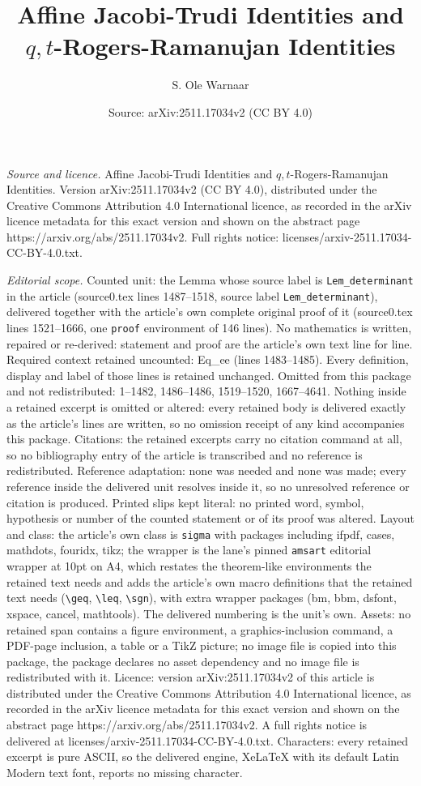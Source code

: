 \documentclass[10pt,a4paper]{amsart}
\title[Affine Jacobi-Trudi Identities and $q,t$-Rogers-Ramanujan Id]{Affine Jacobi-Trudi Identities and $q,t$-Rogers-Ramanujan Identities}
\author{S. Ole Warnaar}
\date{Source: arXiv:2511.17034v2 (CC BY 4.0)}
\begin{document}
\maketitle

\noindent\emph{Source and licence.} Affine Jacobi-Trudi Identities and $q,t$-Rogers-Ramanujan Identities. Version arXiv:2511.17034v2 (CC BY 4.0), distributed under the Creative Commons Attribution 4.0 International licence, as recorded in the arXiv licence metadata for this exact version and shown on the abstract page https://arxiv.org/abs/2511.17034v2. Full rights notice: licenses/arxiv-2511.17034-CC-BY-4.0.txt.\par\smallskip

\noindent\textit{Editorial scope.} Counted unit: the Lemma whose source label is \texttt{Lem\_determinant} in the article (source0.tex lines 1487--1518, source label \texttt{Lem\_determinant}), delivered together with the article's own complete original proof of it (source0.tex lines 1521--1666, one \texttt{proof} environment of 146 lines). No mathematics is written, repaired or re-derived: statement and proof are the article's own text line for line. Required context retained uncounted: Eq\_ee (lines 1483--1485). Every definition, display and label of those lines is retained unchanged. Omitted from this package and not redistributed: 1--1482, 1486--1486, 1519--1520, 1667--4641. Nothing inside a retained excerpt is omitted or altered: every retained body is delivered exactly as the article's lines are written, so no omission receipt of any kind accompanies this package. Citations: the retained excerpts carry no citation command at all, so no bibliography entry of the article is transcribed and no reference is redistributed. Reference adaptation: none was needed and none was made; every reference inside the delivered unit resolves inside it, so no unresolved reference or citation is produced. Printed slips kept literal: no printed word, symbol, hypothesis or number of the counted statement or of its proof was altered. Layout and class: the article's own class is \texttt{sigma} with packages including ifpdf, cases, mathdots, fouridx, tikz; the wrapper is the lane's pinned \texttt{amsart} editorial wrapper at 10pt on A4, which restates the theorem-like environments the retained text needs and adds the article's own macro definitions that the retained text needs (\texttt{\textbackslash geq}, \texttt{\textbackslash leq}, \texttt{\textbackslash sgn}), with extra wrapper packages (bm, bbm, dsfont, xspace, cancel, mathtools). The delivered numbering is the unit's own. Assets: no retained span contains a figure environment, a graphics-inclusion command, a PDF-page inclusion, a table or a TikZ picture; no image file is copied into this package, the package declares no asset dependency and no image file is redistributed with it. Licence: version arXiv:2511.17034v2 of this article is distributed under the Creative Commons Attribution 4.0 International licence, as recorded in the arXiv licence metadata for this exact version and shown on the abstract page https://arxiv.org/abs/2511.17034v2. A full rights notice is delivered at licenses/arxiv-2511.17034-CC-BY-4.0.txt. Characters: every retained excerpt is pure ASCII, so the delivered engine, XeLaTeX with its default Latin Modern text font, reports no missing character.
\end{document}
